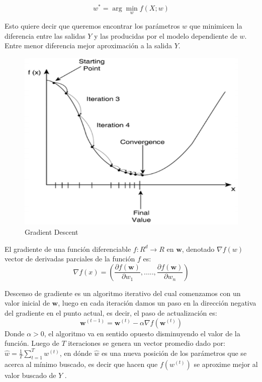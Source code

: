\begin{equation}
w^* =  \arg\min_{w} f(X; w)
\end{equation}

Esto quiere decir que queremos encontrar los parámetros $w$ que minimicen la diferencia entre las salidas $Y$ y las producidas por el modelo dependiente de $w$. Entre menor  diferencia mejor aproximación a la salida $Y$. 

\begin{figure}[H] \centering
  \includegraphics[scale=0.5,keepaspectratio=true,clip=true]{imagenes/MarcoTeorico/gradient-descent.png}
  \caption{Gradient Descent }\label{Fig:gradient-descent}
\end{figure}


El gradiente de una función diferenciable $ f: R^d \longrightarrow R $ en $\textbf{w}$, denotado $ \nabla f(w) $ vector de derivadas parciales de la función $f$ es:
\begin{equation}
\nabla f(x) = (\frac{\partial f(\textbf{w})}{\partial w_1},....., \frac{\partial f(\textbf{w})}{\partial w_n})
\end{equation}

Descenso de gradiente es un algoritmo iterativo del cual comenzamos con un valor inicial de $\textbf{w}$, luego en cada iteración damos un paso en la dirección negativa del gradiente en el punto actual, es decir, el paso de actualización es:
\begin{equation}
\textbf{w}^{(t-1)} = \textbf{w}^{(t)} - \alpha \nabla f(\textbf{w}^{(t)})
\end{equation}
Donde $ \alpha > 0$,  el algoritmo va en sentido opuesto disminuyendo el valor de la función. Luego de $T$ iteraciones se genera un vector promedio dado por: $ \hat{w} = \frac{1}{T} \sum_{t=1}^T w^{(t)}$, en dónde $\hat{w}$ es una nueva posición de los parámetros que se acerca al mínimo buscado, es decir que hacen que $f(w^{(t)})$ se aproxime mejor al valor buscado de $Y$ . 

